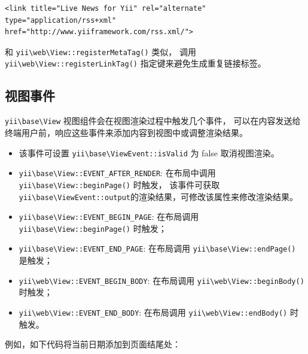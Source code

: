 \lstset{language=html}\begin{lstlisting}
<link title="Live News for Yii" rel="alternate" type="application/rss+xml" href="http://www.yiiframework.com/rss.xml/">
\end{lstlisting}
和 \texttt{yii{\allowbreak{}\textbackslash}web{\allowbreak{}\textbackslash}View\allowbreak{}::\allowbreak{}registerMetaTag()} 类似，
调用\texttt{yii{\allowbreak{}\textbackslash}web{\allowbreak{}\textbackslash}View\allowbreak{}::\allowbreak{}registerLinkTag()} 指定键来避免生成重复链接标签。

\subsection{视图事件 \label{structure-views.md::view-events}}
\texttt{yii{\allowbreak{}\textbackslash}base{\allowbreak{}\textbackslash}View} 视图组件会在视图渲染过程中触发几个事件，
可以在内容发送给终端用户前，响应这些事件来添加内容到视图中或调整渲染结果。

\begin{itemize}
\item 该事件可设置 \texttt{yii{\allowbreak{}\textbackslash}base{\allowbreak{}\textbackslash}ViewEvent\allowbreak{}::\allowbreak{}isValid} 为 false 取消视图渲染。


\item \texttt{yii{\allowbreak{}\textbackslash}base{\allowbreak{}\textbackslash}View\allowbreak{}::\allowbreak{}EVENT\_AFTER\_RENDER}: 在布局中调用 \texttt{yii{\allowbreak{}\textbackslash}base{\allowbreak{}\textbackslash}View\allowbreak{}::\allowbreak{}beginPage()} 时触发，
该事件可获取\texttt{yii{\allowbreak{}\textbackslash}base{\allowbreak{}\textbackslash}ViewEvent\allowbreak{}::\allowbreak{}output}的渲染结果，可修改该属性来修改渲染结果。
\item \texttt{yii{\allowbreak{}\textbackslash}base{\allowbreak{}\textbackslash}View\allowbreak{}::\allowbreak{}EVENT\_BEGIN\_PAGE}: 在布局调用 \texttt{yii{\allowbreak{}\textbackslash}base{\allowbreak{}\textbackslash}View\allowbreak{}::\allowbreak{}beginPage()} 时触发；
\item \texttt{yii{\allowbreak{}\textbackslash}base{\allowbreak{}\textbackslash}View\allowbreak{}::\allowbreak{}EVENT\_END\_PAGE}: 在布局调用 \texttt{yii{\allowbreak{}\textbackslash}base{\allowbreak{}\textbackslash}View\allowbreak{}::\allowbreak{}endPage()} 是触发；
\item \texttt{yii{\allowbreak{}\textbackslash}web{\allowbreak{}\textbackslash}View\allowbreak{}::\allowbreak{}EVENT\_BEGIN\_BODY}: 在布局调用 \texttt{yii{\allowbreak{}\textbackslash}web{\allowbreak{}\textbackslash}View\allowbreak{}::\allowbreak{}beginBody()} 时触发；
\item \texttt{yii{\allowbreak{}\textbackslash}web{\allowbreak{}\textbackslash}View\allowbreak{}::\allowbreak{}EVENT\_END\_BODY}: 在布局调用 \texttt{yii{\allowbreak{}\textbackslash}web{\allowbreak{}\textbackslash}View\allowbreak{}::\allowbreak{}endBody()} 时触发。
\end{itemize}
例如，如下代码将当前日期添加到页面结尾处：

